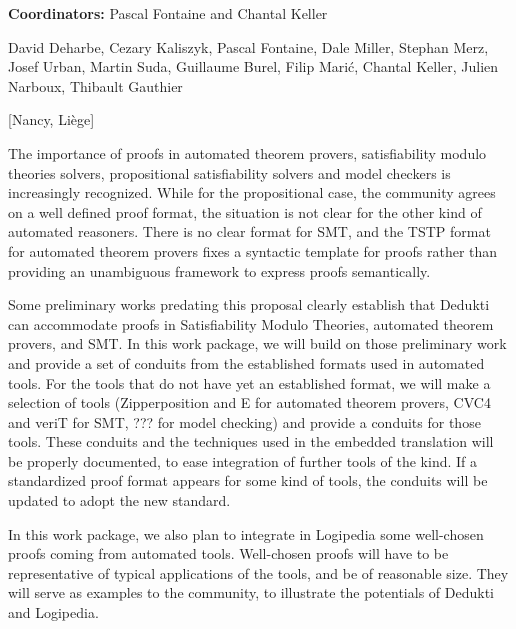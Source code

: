 {\bf Coordinators:} Pascal Fontaine and Chantal Keller 

David Deharbe,
Cezary Kaliszyk,
Pascal Fontaine, Dale Miller, Stephan Merz, Josef Urban, Martin Suda,
Guillaume Burel, Filip Marić, Chantal Keller, Julien Narboux, Thibault Gauthier

[Nancy, Liège]

The importance of proofs in automated theorem provers, satisfiability
modulo theories solvers, propositional satisfiability solvers and
model checkers is increasingly recognized.  While for the
propositional case, the community agrees on a well defined proof
format, the situation is not clear for the other kind of automated
reasoners.  There is no clear format for SMT, and the TSTP format for
automated theorem provers fixes a syntactic template for proofs rather
than providing an unambiguous framework to express proofs
semantically.

Some preliminary works predating this proposal clearly establish that
Dedukti can accommodate proofs in Satisfiability Modulo Theories,
automated theorem provers, and SMT.  In this work package, we will
build on those preliminary work and provide a set of conduits from the
established formats used in automated tools. For the tools that do not
have yet an established format, we will make a selection of tools
(Zipperposition and E for automated theorem provers, CVC4 and veriT
for SMT, ??? for model checking) and provide a conduits for those
tools.  These conduits and the techniques used in the embedded
translation will be properly documented, to ease integration of
further tools of the kind.  If a standardized proof format appears for
some kind of tools, the conduits will be updated to adopt the new
standard.

In this work package, we also plan to integrate in Logipedia some
well-chosen proofs coming from automated tools.  Well-chosen proofs
will have to be representative of typical applications of the tools,
and be of reasonable size.  They will serve as examples to the
community, to illustrate the potentials of Dedukti and Logipedia.
